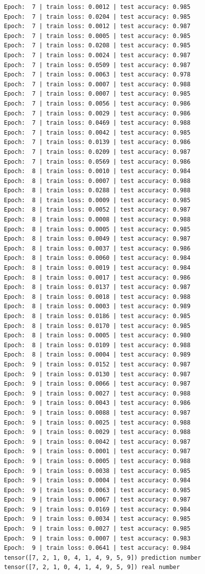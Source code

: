 \documentclass[11pt,UTF8]{ctexart}
\begin{document}
\begin{verbatim}
Epoch:  7 | train loss: 0.0012 | test accuracy: 0.985
Epoch:  7 | train loss: 0.0204 | test accuracy: 0.985
Epoch:  7 | train loss: 0.0012 | test accuracy: 0.987
Epoch:  7 | train loss: 0.0005 | test accuracy: 0.985
Epoch:  7 | train loss: 0.0208 | test accuracy: 0.985
Epoch:  7 | train loss: 0.0024 | test accuracy: 0.987
Epoch:  7 | train loss: 0.0509 | test accuracy: 0.987
Epoch:  7 | train loss: 0.0063 | test accuracy: 0.978
Epoch:  7 | train loss: 0.0007 | test accuracy: 0.988
Epoch:  7 | train loss: 0.0007 | test accuracy: 0.985
Epoch:  7 | train loss: 0.0056 | test accuracy: 0.986
Epoch:  7 | train loss: 0.0029 | test accuracy: 0.986
Epoch:  7 | train loss: 0.0469 | test accuracy: 0.988
Epoch:  7 | train loss: 0.0042 | test accuracy: 0.985
Epoch:  7 | train loss: 0.0139 | test accuracy: 0.986
Epoch:  7 | train loss: 0.0209 | test accuracy: 0.987
Epoch:  7 | train loss: 0.0569 | test accuracy: 0.986
Epoch:  8 | train loss: 0.0010 | test accuracy: 0.984
Epoch:  8 | train loss: 0.0007 | test accuracy: 0.988
Epoch:  8 | train loss: 0.0288 | test accuracy: 0.988
Epoch:  8 | train loss: 0.0009 | test accuracy: 0.985
Epoch:  8 | train loss: 0.0052 | test accuracy: 0.987
Epoch:  8 | train loss: 0.0008 | test accuracy: 0.988
Epoch:  8 | train loss: 0.0005 | test accuracy: 0.985
Epoch:  8 | train loss: 0.0049 | test accuracy: 0.987
Epoch:  8 | train loss: 0.0037 | test accuracy: 0.986
Epoch:  8 | train loss: 0.0060 | test accuracy: 0.984
Epoch:  8 | train loss: 0.0019 | test accuracy: 0.984
Epoch:  8 | train loss: 0.0017 | test accuracy: 0.986
Epoch:  8 | train loss: 0.0137 | test accuracy: 0.987
Epoch:  8 | train loss: 0.0018 | test accuracy: 0.988
Epoch:  8 | train loss: 0.0003 | test accuracy: 0.989
Epoch:  8 | train loss: 0.0186 | test accuracy: 0.985
Epoch:  8 | train loss: 0.0170 | test accuracy: 0.985
Epoch:  8 | train loss: 0.0005 | test accuracy: 0.980
Epoch:  8 | train loss: 0.0109 | test accuracy: 0.988
Epoch:  8 | train loss: 0.0004 | test accuracy: 0.989
Epoch:  9 | train loss: 0.0152 | test accuracy: 0.987
Epoch:  9 | train loss: 0.0130 | test accuracy: 0.987
Epoch:  9 | train loss: 0.0066 | test accuracy: 0.987
Epoch:  9 | train loss: 0.0027 | test accuracy: 0.988
Epoch:  9 | train loss: 0.0043 | test accuracy: 0.986
Epoch:  9 | train loss: 0.0088 | test accuracy: 0.987
Epoch:  9 | train loss: 0.0025 | test accuracy: 0.988
Epoch:  9 | train loss: 0.0029 | test accuracy: 0.988
Epoch:  9 | train loss: 0.0042 | test accuracy: 0.987
Epoch:  9 | train loss: 0.0001 | test accuracy: 0.987
Epoch:  9 | train loss: 0.0005 | test accuracy: 0.988
Epoch:  9 | train loss: 0.0038 | test accuracy: 0.985
Epoch:  9 | train loss: 0.0004 | test accuracy: 0.984
Epoch:  9 | train loss: 0.0063 | test accuracy: 0.985
Epoch:  9 | train loss: 0.0067 | test accuracy: 0.987
Epoch:  9 | train loss: 0.0169 | test accuracy: 0.984
Epoch:  9 | train loss: 0.0034 | test accuracy: 0.985
Epoch:  9 | train loss: 0.0027 | test accuracy: 0.985
Epoch:  9 | train loss: 0.0007 | test accuracy: 0.983
Epoch:  9 | train loss: 0.0641 | test accuracy: 0.984
tensor([7, 2, 1, 0, 4, 1, 4, 9, 5, 9]) prediction number
tensor([7, 2, 1, 0, 4, 1, 4, 9, 5, 9]) real number
\end{verbatim}

\clearpage
\end{document}
